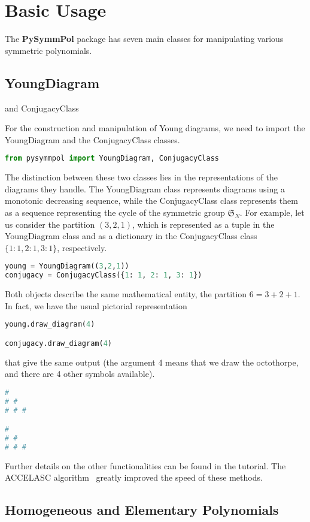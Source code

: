\documentclass[a4paper,10pt]{amsart}
\begin{document}
\section{Basic Usage}

The \textbf{PySymmPol} package has seven main classes for manipulating
various symmetric polynomials.

\subsection{YoungDiagram} and ConjugacyClass

For the construction and manipulation of Young diagrams, we need to import 
the YoungDiagram and the ConjugacyClass classes. 
\begin{lstlisting}[language=Python]
from pysymmpol import YoungDiagram, ConjugacyClass
\end{lstlisting}

The distinction between these two classes lies in the representations of the diagrams 
they handle. The YoungDiagram class represents diagrams using a monotonic decreasing sequence, 
while the ConjugacyClass class represents them as a sequence representing the cycle 
of the symmetric group $\mathfrak{S}_N$. For example, let us consider the partition
$(3,2,1)$, which is represented as a tuple in the YoungDiagram class and 
as a dictionary in the ConjugacyClass class $\{1: 1, 2: 1, 3: 1\}$, respectively.
\begin{lstlisting}[language=Python]
young = YoungDiagram((3,2,1))
conjugacy = ConjugacyClass({1: 1, 2: 1, 3: 1})
\end{lstlisting}
Both objects describe the same mathematical entity, the partition \(6=3+2+1\).
In fact, 
we have the usual pictorial representation 
\begin{lstlisting}[language=Python]
young.draw_diagram(4)

conjugacy.draw_diagram(4)
\end{lstlisting}
that give the same output (the argument 4 means that we draw the octothorpe, and
there are 4 other symbols available).
\begin{lstlisting}[language=Python]
#
# #
# # #

#
# #
# # #
\end{lstlisting}
Further details on the other functionalities can be found in the tutorial.
The \textrm{ACCELASC} algorithm~\cite{Kelleher:2009} greatly improved the
speed of these methods.

\subsection{Homogeneous and Elementary Polynomials}
\end{document}

